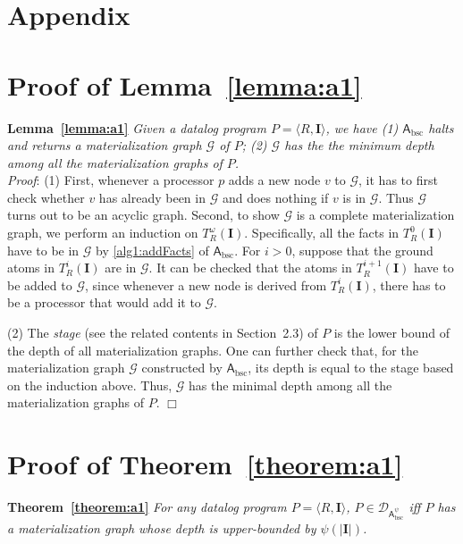 \section*{Appendix}

\appendix

\section{Proof of Lemma~\ref{lemma:a1}}

\textbf{Lemma~\ref{lemma:a1}}
\emph{Given a datalog program $P=\langle R, \textbf{I}\rangle$, we have
(1) $\mathsf{A}_{\text{bsc}}$ halts and returns a materialization graph $\mathcal{G}$ of $P$;
(2) $\mathcal{G}$ has the the minimum depth among all the materialization graphs of $P$.}\\

\noindent\emph{Proof}:
(1) First, whenever a processor $p$ adds a new node $v$ to $\mathcal{G}$, it has to first
check whether $v$ has already been in $\mathcal{G}$ and does nothing if $v$ is in $\mathcal{G}$.
Thus $\mathcal{G}$ turns out to be an acyclic graph.
Second, to show $\mathcal{G}$ is a
complete materialization graph, we perform an induction on $T_R^{\omega}(\textbf{I})$.
Specifically, all the facts in $T_R^{0}(\textbf{I})$ have to be in $\mathcal{G}$ by \ref{alg1:addFacts}
of $\mathsf{A}_{\text{bsc}}$.
For $i>0$, suppose that the ground atoms in $T_R^{i}(\textbf{I})$ are in $\mathcal{G}$.
It can be checked that the atoms in $T_R^{i+1}(\textbf{I})$ have to be
added to $\mathcal{G}$, since whenever a new node is derived from $T_R^{i}(\textbf{I})$,
there has to be a processor that would add it to $\mathcal{G}$.

(2) The \emph{stage} (see the related contents in Section~2.3) of $P$ is the lower bound of the depth
of all materialization graphs. One can further check that, for the materialization graph $\mathcal{G}$
constructed by $\mathsf{A}_{\text{bsc}}$, its depth is equal to the stage based on the induction above.
Thus, $\mathcal{G}$ has the minimal depth among all the materialization graphs of $P$. \hfill$\Box$

\section{Proof of Theorem~\ref{theorem:a1}}

\textbf{Theorem~\ref{theorem:a1}}
\emph{For any datalog program $P=\langle R, \textbf{I}\rangle$, $P\in\mathcal{D}_{\mathsf{A}_{\text{bsc}}^{\psi}}$ iff
$P$ has a materialization graph whose depth is upper-bounded by $\psi(|\textbf{I}|)$.}\\


